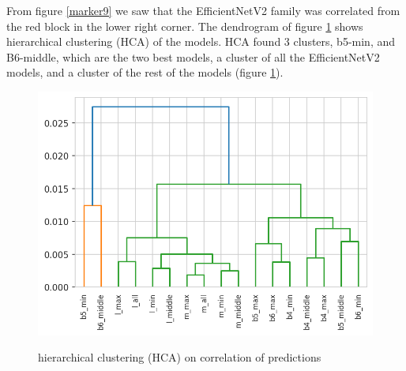 \documentclass[10pt,letterpaper]{article}
\begin{document}
From figure \ref{marker9} we saw that the EfficientNetV2 family was correlated from the red block in the lower right corner. The dendrogram of figure \ref{marker10} shows hierarchical clustering (HCA) of the models. HCA found 3 clusters, b5-min, and B6-middle, which are the two best models, a cluster of all the EfficientNetV2 models, and a cluster of the rest of the models (figure \ref{marker10}).

\begin{figure}[h!]
  \caption{hierarchical clustering (HCA) on correlation of predictions}
  \centering
  \includegraphics[scale=0.8]{results/eda/hca.png}
  \label{marker10}
\end{figure}
\end{document}
